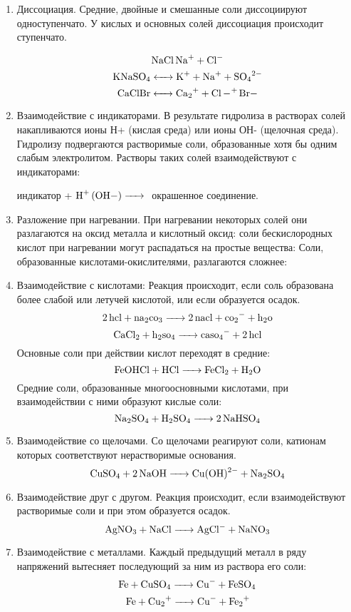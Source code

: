 \begin{enumerate}
    \item  Диссоциация. Средние, двойные и смешанные соли диссоциируют одноступенчато. У кислых и основных солей диссоциация происходит ступенчато.

        $$\ce{NaCl  Na+ + Cl-}$$
        $$\ce{KNaSO4 <-> K+ + Na+ + SO4^2-}$$
        $$\ce{CaClBr <-> Ca2+ + Cl -+ Br-}$$
    \item Взаимодействие с индикаторами. В результате гидролиза в растворах солей накапливаются ионы Н+ (кислая среда) или ионы ОН- (щелочная среда). Гидролизу подвергаются растворимые соли, образованные хотя бы одним слабым электролитом. Растворы таких солей взаимодействуют с индикаторами:

        индикатор + $\ce{H+ (OH-) ->}$  окрашенное соединение.

    \item Разложение при нагревании. При нагревании некоторых солей они разлагаются на оксид металла и кислотный оксид:
        соли бескислородных кислот при нагревании могут распадаться на простые вещества:
        Соли, образованные кислотами-окислителями, разлагаются сложнее:
    \item Взаимодействие с кислотами: Реакция происходит, если соль образована более слабой или летучей кислотой, или если образуется осадок.
        $$\ce{2hcl + na2co3 -> 2nacl + co2- + h2o}$$
        $$\ce{CaCl2 + h2so4 -> caso4- + 2hcl}$$
        Основные соли при действии кислот переходят в средние:
        $$\ce{FeOHCl + HCl -> FeCl2 + H2O}$$
        Средние соли, образованные многоосновными кислотами, при взаимодействии с ними образуют кислые соли:
        $$\ce{Na2SO4 + H2SO4 -> 2NaHSO4}$$
    \item Взаимодействие со щелочами. Со щелочами реагируют соли, катионам которых соответствуют нерастворимые основания.
        $$\ce{CuSO4 + 2NaOH -> Cu(OH)^2- + Na2SO4}$$
    \item Взаимодействие друг с другом. Реакция происходит, если взаимодействуют растворимые соли и при этом образуется осадок.
        $$\ce{AgNO3 + NaCl -> AgCl- + NaNO3}$$
    \item Взаимодействие с металлами. Каждый предыдущий металл в ряду напряжений вытесняет последующий за ним из раствора его соли:
        $$\ce{Fe + CuSO4 -> Cu- + FeSO4}$$
        $$\ce{Fe + Cu2+ -> Cu- + Fe2+}$$


\end{enumerate}

